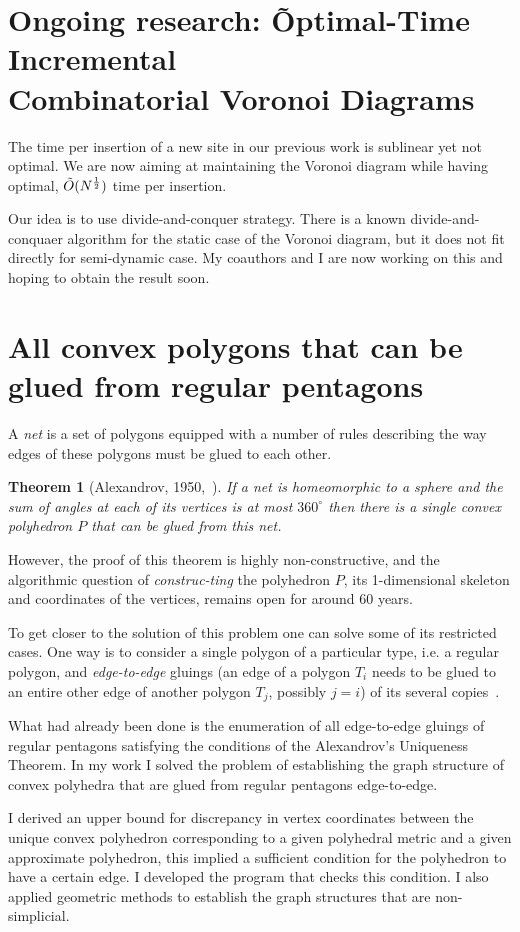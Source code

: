 \documentclass[a4paper,11pt]{article}
\def\vsection#1{\vspace{-4mm}\section{#1}\vspace{-3mm}}
\newtheorem{theorem}{Theorem}
\theoremstyle{definition}
\begin{document}
\vsection{Ongoing research: \~Optimal-Time Incremental \\
	Combinatorial Voronoi Diagrams}

The time per insertion of a new site in our previous work is sublinear yet not optimal. We are now aiming at maintaining the Voronoi diagram while having optimal, $\tilde O(N^{\frac12})$ time per insertion.

Our idea is to use divide-and-conquer strategy. There is a known divide-and-conquaer algorithm for the static case of the Voronoi diagram, but it does not fit directly for semi-dynamic case. My coauthors and I are now working on this and hoping to obtain the result soon.

\vsection{All convex polygons that can be glued from regular pentagons}

	A \emph{net} is a set of polygons equipped with a number of rules describing the way edges of these polygons must be glued to each other.

\vspace{-2mm} \begin{theorem}[Alexandrov, 1950,~\cite{alex}]
\label{thm:alexandrov}
	If a net is homeomorphic to a sphere and the sum of angles at each of its vertices is at most $360^\circ$ then there is a single convex polyhedron $P$ that can be glued from this net.
\end{theorem} \vspace{-3mm}

However, the proof of this theorem is highly non-constructive, and the algorithmic question of {\it construc-\linebreak ting} the polyhedron $P$, its 1-dimensional skeleton and coordinates of the vertices, remains open for around 60 years.

To get closer to the solution of this problem one can solve some of its restricted cases. One way is to consider a single polygon of a particular type, i.e. a regular polygon, and {\it edge-to-edge} gluings (an edge of a polygon $T_i$ needs to be glued to an entire other edge of another polygon $T_j$, possibly $j=i$) of its several copies~\cite{gfalop}.

What had already been done is the enumeration of all edge-to-edge gluings of regular pentagons satisfying the conditions of the Alexandrov's Uniqueness Theorem. In my work I solved the problem of establishing the graph structure of convex polyhedra that are glued from regular pentagons edge-to-edge.

I derived an upper bound for discrepancy in vertex coordinates between the unique convex polyhedron corresponding to a given polyhedral metric and a given approximate polyhedron, this implied a sufficient condition for the polyhedron to have a certain edge. I developed the program that checks this condition. I also applied geometric methods to establish the graph structures that are non-simplicial.
\end{document}

